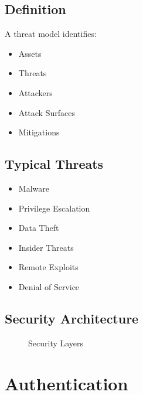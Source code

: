 \subsection{Definition}

A threat model identifies:

\begin{itemize}
\item Assets
\item Threats
\item Attackers
\item Attack Surfaces
\item Mitigations
\end{itemize}

\subsection{Typical Threats}

\begin{itemize}
\item Malware
\item Privilege Escalation
\item Data Theft
\item Insider Threats
\item Remote Exploits
\item Denial of Service
\end{itemize}

\subsection{Security Architecture}

\begin{figure}[h]
\centering
{}
\caption{Security Layers}
\end{figure}

\section{Authentication}

